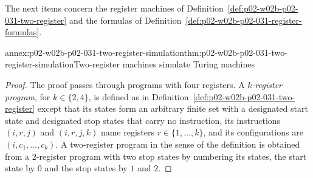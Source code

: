 The next items concern the register machines of
Definition~\ref{def:p02-w02b-p02-031-two-register} and the formulas of
Definition~\ref{def:p02-w02b-p02-031-register-formulas}.

\begin{annexitem}{annex:p02-w02b-p02-031-two-register-simulation}{thm:p02-w02b-p02-031-two-register-simulation}{Two-register machines simulate Turing machines}
\begin{proof}
The proof passes through programs with four registers.  A
\emph{\(k\)-register program}, for \(k\in\{2,4\}\), is defined as in
Definition~\ref{def:p02-w02b-p02-031-two-register} except that its states form
an arbitrary finite set with a designated start state and designated stop
states that carry no instruction, its instructions \((i,r,j)\) and
\((i,r,j,k)\) name registers \(r\in\{1,\ldots,k\}\), and its configurations are
\((i,c_1,\ldots,c_k)\).  A two-register program in the sense of the definition
is obtained from a \(2\)-register program with two stop states by numbering
its states, the start state by \(0\) and the stop states by \(1\) and \(2\).


\end{proof}
\end{annexitem}
